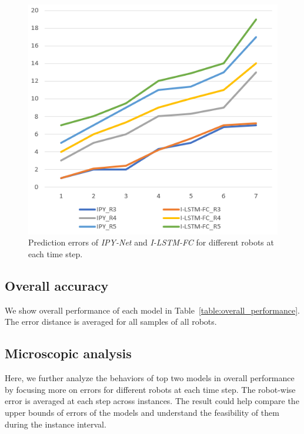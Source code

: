 \documentclass[letterpaper, 10 pt, conference]{ieeeconf}  %
\begin{document}
	\begin{figure}[t]
		\centering
		\includegraphics[width=.8\columnwidth]{fig_micro_eval}
		\caption{Prediction errors of \emph{IPY-Net} and \emph{I-LSTM-FC} 
			for different robots at each time step.  
		}
		\label{fig:micro_eval}
	\end{figure}

	
	\subsection{Overall accuracy}
	\label{sec:overall_performance}
	
	We show overall performance of each model in Table~\ref{table:overall_performance}. 
	The error distance is averaged for all samples of all robots. 

	
	\subsection{Microscopic analysis}
	\label{sec:microscopic_analysis}
	
	Here, we further analyze the behaviors of top two models in overall performance 
	by focusing more on errors for different robots at each time step. 
	The robot-wise error is averaged at each step across instances. 
	The result could help compare the upper bounds of errors of the models and 
	understand the feasibility of them during the instance interval. 
\end{document}
